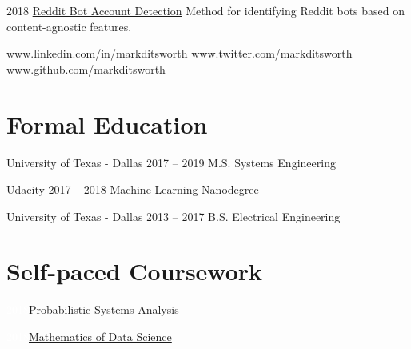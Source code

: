 \documentclass{tccv}
\begin{document}
\begin{yearlist}
	\item{2018}
	{\href{https://chatbotslife.com/bot-detection-with-network-science-dde6525005f2}{Reddit Bot Account Detection}}
	{Method for identifying Reddit bots based on content-agnostic features.}
	
	
\end{yearlist}

    {www.linkedin.com/in/markditsworth}
    {www.twitter.com/markditsworth}
    {www.github.com/markditsworth}

\section{Formal Education}

\begin{yearlist} 

\item[University of Texas - Dallas]{2017 -- 2019}
     {M.S. Systems Engineering}{}

\item[Udacity]{2017 -- 2018}
	 {Machine Learning Nanodegree}{}

\item[University of Texas - Dallas]{2013 -- 2017}
     {B.S. Electrical Engineering}{}

\end{yearlist}
\vspace{-30pt}
\section{Self-paced Coursework}
\begin{factlist}
\item{\textcolor{white}{2018}}{\href{https://github.com/markditsworth/psa}{Probabilistic Systems Analysis}}
\item{\textcolor{white}{2018}}{\href{https://github.com/markditsworth/mds}{Mathematics of Data Science}}
\end{factlist}
\end{document}
